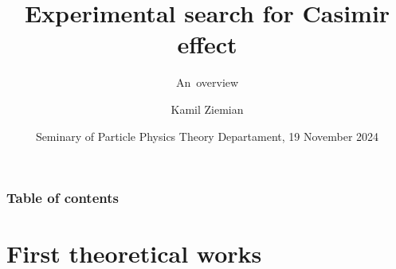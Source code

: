 \documentclass[10pt,t]{beamer}
\title{Experimental search for Casimir effect}
\subtitle{An~overview}
\author{Kamil Ziemian \\
  \email}
\date[19 XI 2024]{Seminary of Particle Physics Theory Departament,
  19 November 2024}
\begin{document}





\RaggedRight





\maketitle





\begin{frame}
  \frametitle{Table of contents}


  \tableofcontents

\end{frame}
















\section{First theoretical works}
\end{document}
